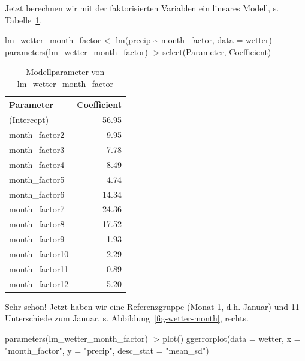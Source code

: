 \documentclass[
  letterpaper,
  oneside,
  open=any]{scrbook}
\newenvironment{Shaded}{\begin{snugshade}}{\end{snugshade}}
\newcommand{\AttributeTok}[1]{\textcolor[rgb]{0.40,0.45,0.13}{#1}}
\newcommand{\FunctionTok}[1]{\textcolor[rgb]{0.28,0.35,0.67}{#1}}
\newcommand{\NormalTok}[1]{\textcolor[rgb]{0.00,0.23,0.31}{#1}}
\newcommand{\OtherTok}[1]{\textcolor[rgb]{0.00,0.23,0.31}{#1}}
\newcommand{\SpecialCharTok}[1]{\textcolor[rgb]{0.37,0.37,0.37}{#1}}
\newcommand{\StringTok}[1]{\textcolor[rgb]{0.13,0.47,0.30}{#1}}
\theoremstyle{definition}
\theoremstyle{definition}
\theoremstyle{definition}
\theoremstyle{remark}
\begin{document}
Jetzt berechnen wir mit der faktorisierten Variablen ein lineares
Modell, s. Tabelle~\ref{tbl-lm_wetter_month_factor}.

\begin{Shaded}
\begin{Highlighting}[]
\NormalTok{lm\_wetter\_month\_factor }\OtherTok{\textless{}{-}} \FunctionTok{lm}\NormalTok{(precip }\SpecialCharTok{\textasciitilde{}}\NormalTok{ month\_factor, }\AttributeTok{data =}\NormalTok{ wetter)}
\FunctionTok{parameters}\NormalTok{(lm\_wetter\_month\_factor) }\SpecialCharTok{|\textgreater{}} 
  \FunctionTok{select}\NormalTok{(Parameter, Coefficient)}
\end{Highlighting}
\end{Shaded}

\begin{longtable}[]{@{}lr@{}}

\caption{\label{tbl-lm_wetter_month_factor}Modellparameter von
lm\_wetter\_month\_factor}

\tabularnewline

\toprule\noalign{}
Parameter & Coefficient \\
\midrule\noalign{}
\endhead
\bottomrule\noalign{}
\endlastfoot
(Intercept) & 56.95 \\
month\_factor2 & -9.95 \\
month\_factor3 & -7.78 \\
month\_factor4 & -8.49 \\
month\_factor5 & 4.74 \\
month\_factor6 & 14.34 \\
month\_factor7 & 24.36 \\
month\_factor8 & 17.52 \\
month\_factor9 & 1.93 \\
month\_factor10 & 2.29 \\
month\_factor11 & 0.89 \\
month\_factor12 & 5.20 \\

\end{longtable}

Sehr schön! Jetzt haben wir eine Referenzgruppe (Monat 1, d.h. Januar)
und 11 Unterschiede zum Januar, s. Abbildung~\ref{fig-wetter-month},
rechts.

\begin{Shaded}
\begin{Highlighting}[]
\FunctionTok{parameters}\NormalTok{(lm\_wetter\_month\_factor) }\SpecialCharTok{|\textgreater{}} \FunctionTok{plot}\NormalTok{()}
\FunctionTok{ggerrorplot}\NormalTok{(}\AttributeTok{data =}\NormalTok{ wetter, }\AttributeTok{x =} \StringTok{"month\_factor"}\NormalTok{, }\AttributeTok{y =} \StringTok{"precip"}\NormalTok{,}
            \AttributeTok{desc\_stat =} \StringTok{"mean\_sd"}\NormalTok{)}
\end{Highlighting}
\end{Shaded}
\end{document}
